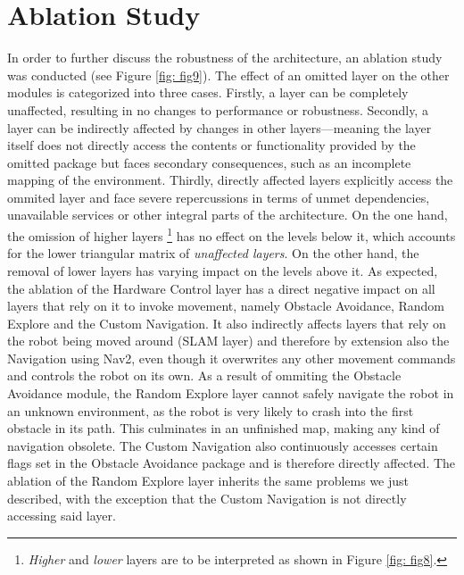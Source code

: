\documentclass[%
paper=A4,               %
twoside=true,           %
openright,              %
11pt,                   %
bibliography=totoc,     %
titlepage=on,           %
DIV=12,                 %
BCOR=1.5cm,             %
parskip=half,            %
final
]{scrreprt}
\begin{document}
	\newpage
	
	
	\section{Ablation Study}  
	In order to further discuss the robustness of the architecture, an ablation study was conducted (see Figure \ref{fig: fig9}). The effect of an omitted layer on the other modules is categorized into three cases. Firstly, a layer can be completely unaffected, resulting in no changes to performance or robustness. Secondly, a layer can be indirectly affected by changes in other layers—meaning the layer itself does not directly access the contents or functionality provided by the omitted package but faces secondary consequences, such as an incomplete mapping of the environment. Thirdly, directly affected layers explicitly access the ommited layer and face severe repercussions in terms of unmet dependencies, unavailable services or other integral parts of the architecture. On the one hand, the omission of higher layers \footnote{\textit{Higher} and \textit{lower} layers are to be interpreted as shown in Figure \ref{fig: fig8}.} has no effect on the levels below it, which accounts for the lower triangular matrix of \textit{unaffected layers}. On the other hand, the removal of lower layers has varying impact on the levels above it. \newline 
	As expected, the ablation of the Hardware Control layer has a direct negative impact on all layers that rely on it to invoke movement, namely Obstacle Avoidance, Random Explore and the Custom Navigation. It also indirectly affects layers that rely on the robot being moved around (SLAM layer) and therefore by extension also the Navigation using Nav2, even though it overwrites any other movement commands and controls the robot on its own. \newline
	As a result of ommiting the Obstacle Avoidance module, the Random Explore layer cannot safely navigate the robot in an unknown environment, as the robot is very likely to crash into the first obstacle in its path. This culminates in an unfinished map, making any kind of navigation obsolete. The Custom Navigation also continuously accesses certain flags set in the Obstacle Avoidance package and is therefore directly affected. \newline
	The ablation of the Random Explore layer inherits the same problems we just described, with the exception that the Custom Navigation is not directly accessing said layer. \newline
\end{document}
